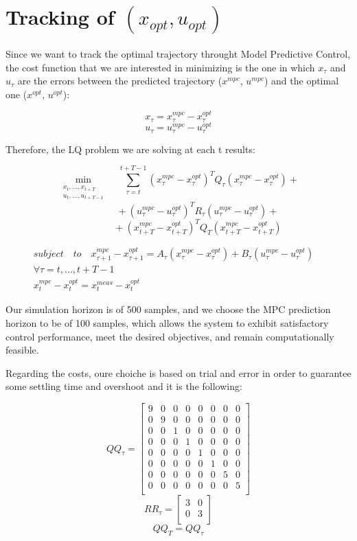 \section{Tracking of $(x_{opt}, u_{opt})$}
Since we want to track the optimal trajectory throught Model Predictive Control, the cost function that we are interested in minimizing is the one in which $x_\tau$ and $u_\tau$ are the errors between the predicted trajectory ($x^{mpc}$, $u^{mpc}$) and the optimal one ($x^{opt}$, $u^{opt}$): 

\[x_\tau = x_\tau^{mpc} - x_\tau^{opt}\]
\[u_\tau = u_\tau^{mpc} - u_\tau^{opt}\]

Therefore, the LQ problem we are solving at each t results: 

\[\min_{\substack{x_t,...,x_{t+T} \\ u_t,...,u_{t+T-1}}} \quad \sum_{\tau=t}^{t+T-1} (x_\tau^{mpc} - x_\tau^{opt})^T Q_\tau (x_\tau^{mpc} - x_\tau^{opt}) +\]
\[\qquad \qquad + (u_\tau^{mpc} - u_\tau^{opt})^T R_\tau (u_\tau^{mpc} - u_\tau^{opt}) + \]
\[\qquad \qquad + (x_{t+T}^{mpc} - x_{t+T}^{opt})^T Q_T (x_{t+T}^{mpc} - x_{t+T}^{opt}) \]

\begin{align*} subject \quad to \quad 
 x_{\tau+1}^{mpc} - x_{\tau+1}^{opt} = A_\tau (x_\tau^{mpc} - x_\tau^{opt}) + B_\tau  (u_\tau^{mpc} - u_\tau^{opt}) \quad \\
 \forall \tau = t, ..., t+T-1 \\ 
 x_t^{mpc} - x_t^{opt} = x^{meas}_t  - x_t^{opt}\qquad \qquad \qquad \qquad \qquad \quad 
\end{align*}


Our simulation horizon is of 500 samples, and we choose the MPC prediction horizon to be of 100 samples, which allows the system to exhibit satisfactory control performance, meet the desired objectives, and remain computationally feasible. 

Regarding the costs, oure choiche is based on trial and error in order to guarantee some settling time and overshoot and it is the following: 

\[
QQ_\tau = \begin{bmatrix}
9 & 0 & 0 & 0 & 0 & 0 & 0 & 0 \\
0 & 9 & 0 & 0 & 0 & 0 & 0 & 0 \\
0 & 0 & 1 & 0 & 0 & 0 & 0 & 0 \\
0 & 0 & 0 & 1 & 0 & 0 & 0 & 0 \\
0 & 0 & 0 & 0 & 1 & 0 & 0 & 0 \\
0 & 0 & 0 & 0 & 0 & 1 & 0 & 0 \\
0 & 0 & 0 & 0 & 0 & 0 & 5 & 0 \\
0 & 0 & 0 & 0 & 0 & 0 & 0 & 5 \\
\end{bmatrix}
\]
\[
RR_\tau = \begin{bmatrix}
3 & 0 \\
0 & 3 \\
\end{bmatrix}
\]
\[
QQ_T = QQ_\tau
\]

